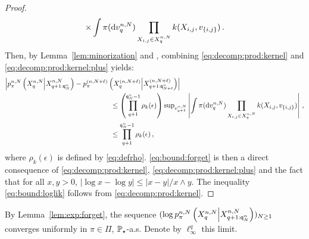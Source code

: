 \begin{proof}
\begin{multline}
\times\int \pi(\mathrm{d} v_q^{n,N})\prod_{X_{i,j}\in X_{q}^{n,N}}k(X_{i,j},v_{\{i,j\}})\,.
\end{multline}
Then, by Lemma~\ref{lem:minorization} and \cite{lindvall:1992}, combining \eqref{eq:decomp:prod:kernel} and \eqref{eq:decomp:prod:kernel:plus} yields:
\begin{align*}
\left|p_{\pi}^{n,N}\left(X_{q}^{n,N}\middle|X_{q+1:\ordermax{n}{N}}^{n,N}\right) -  p_{\pi}^{(n,N+\ell)}\left(X_{q}^{(n,N+\ell)}\middle|X_{q+1:\ordermax{n}{N+\ell}}^{(n,N+\ell)}\right) \right|&\\
&\hspace{-3.5cm}\leq \left(\prod_{q+1}^{\ordermax{n}{N}-1}\rho_k(\epsilon)\right) \sup_{v^{n,N}_{q+1}}\left|\int\pi(\rmd v^{n,N}_q)\prod_{X_{i,j}\in X_{q}^{n,N}}\condlik(X_{i,j},v_{\{i,j\}})\right|\eqsp,\\
&\hspace{-3.5cm}\le \prod_{q+1}^{\ordermax{n}{N}-1}\rho_k(\epsilon)\eqsp,
\end{align*}
where $\rho_k(\epsilon)$ is defined by \eqref{eq:defrho}. \eqref{eq:bound:forget} is then a direct consequence of \eqref{eq:decomp:prod:kernel}, \eqref{eq:decomp:prod:kernel:plus} and the fact that 
for all $x,y>0$, $|\log x - \log y| \le |x-y|/x\wedge y$.
The inequality \eqref{eq:bound:loglik} follows from \eqref{eq:decomp:prod:kernel}. 
\end{proof}

By Lemma~\ref{lem:exp:forget}, the sequence $(\log p_{\pi}^{n,N}\left(X_{q}^{n,N}\middle|X_{q+1:{\mathsf{q}}^{n}_{N}}^{n,N}\right))_{N\ge 1}$ converges uniformly in $\pi\in\Pi$, $\mathbb{P}_{\star}$-a.s. Denote by $\ell^q_{\infty}$ this limit. 

